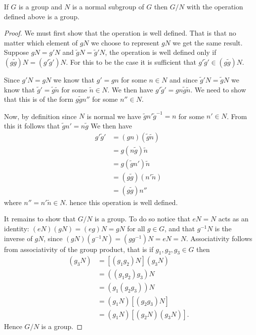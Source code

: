 \documentclass[fleqn]{NotesClass}
\begin{document}
    \begin{thm}{}{}
        If \(G\) is a group and \(N\) is a normal subgroup of \(G\) then \(G/N\) with the operation defined above is a group.
        
        \begin{proof}
            We must first show that the operation is well defined.
            That is that no matter which element of \(gN\) we choose to represent \(gN\) we get the same result.
            Suppose \(gN = g'N\) and \(\tilde{g}N = \tilde{g}'N\), the operation is well defined only if \((g\tilde{g})N = (g'\tilde{g}')N\).
            For this to be the case it is sufficient that \(g'\tilde{g}' \in (g\tilde{g})N\).
            
            Since \(g'N = gN\) we know that \(g' = gn\) for some \(n \in N\) and since \(\tilde{g}'N = \tilde{g}N\) we know that \(\tilde{g}' = \tilde{g}\tilde{n}\) for some \(\tilde{n}\in N\).
            We then have \(g'\tilde{g}' = gn\tilde{g}\tilde{n}\).
            We need to show that this is of the form \(g\tilde{g}n''\) for some \(n'' \in N\).
            
            Now, by definition since \(N\) is normal we have \(\tilde{g}n'\tilde{g}^{-1} = n\) for some \(n' \in N\).
            From this it follows that \(\tilde{g}n' = n\tilde{g}\)
            We then have
            \begin{align}
                g'\tilde{g}' &= (gn)(\tilde{g}\tilde{n})\\
                &= g(n\tilde{g})\tilde{n}\\
                &= g(\tilde{g}n')\tilde{n}\\
                &= (g\tilde{g})(n'\tilde{n})\\
                &= (g\tilde{g})n''
            \end{align}
            where \(n'' = n'\tilde{n} \in N\).
            hence this operation is well defined.
            
            It remains to show that \(G/N\) is a group.
            To do so notice that \(eN = N\) acts as an identity: \((eN)(gN) = (eg)N = gN\) for all \(g \in G\), and that \(g^{-1}N\) is the inverse of \(gN\), since \((gN)(g^{-1}N) = (gg^{-1})N = eN = N\).
            Associativity follows from associativity of the group product, that is if \(g_1, g_2, g_3 \in G\) then
            \begin{align}
                [(g_1N)(g_2N)](g_3N) &= [(g_1g_2)N](g_3N)\\
                &= ((g_1g_2)g_3)N\\
                &= (g_1(g_2g_3))N\\
                &= (g_1N)[(g_2g_3)N]\\
                &= (g_1N)[(g_2N)(g_3N)].
            \end{align}
            Hence \(G/N\) is a group.
        \end{proof}
    \end{thm}
    
\end{document}
